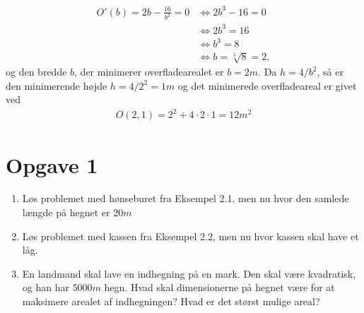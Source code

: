 \begin{exa}
\begin{align*}
O'(b) = 2b-\frac{16}{b^2}=0&\Leftrightarrow 2b^3-16=0\\
						&\Leftrightarrow 2b^3 = 16\\
						&\Leftrightarrow b^3 = 8\\
						&\Leftrightarrow b = \sqrt[3]{8} = 2,
\end{align*}
og den bredde $b$, der minimerer overfladearealet er $b=2m$. Da $h=4/b^2$, så er den minimerende højde $h=4/2^2=1m$ og det minimerede overfladeareal er givet ved
\begin{align*}
O(2,1) = 2^2+4\cdot 2\cdot 1 = 12m^2
\end{align*}
\end{exa}

\section*{Opgave 1}
\begin{enumerate}[label=\roman*)]
\item Løs problemet med hønseburet fra Eksempel 2.1, men nu hvor den samlede længde på hegnet er $20m$
\item Løs problemet med kassen fra Eksempel 2.2, men nu hvor kassen skal have et låg.
\item En landmand skal lave en indhegning på en mark. Den skal være kvadratisk, og han har $5000m$ hegn. Hvad skal dimensionerne på hegnet være for at maksimere arealet af indhegningen? Hvad er det størst mulige areal?
\end{enumerate}